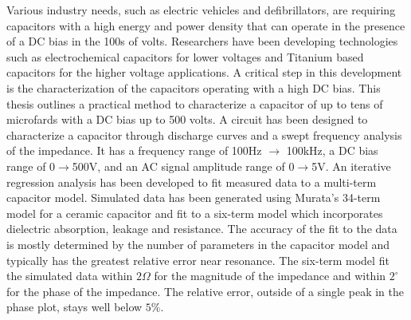 \label{sec:abstract}
Various industry needs, such as electric vehicles and defibrillators, are requiring capacitors with a high energy and power density that can operate in the presence of a DC bias in the 100s of volts. Researchers have been developing technologies such as electrochemical capacitors for lower voltages and Titanium based capacitors for the higher voltage applications. A critical step in this development is the characterization of the capacitors operating with a high DC bias.
This thesis outlines a practical method to characterize a capacitor of up to tens of microfards with a DC bias up to 500 volts. A circuit has been designed to characterize a capacitor through discharge curves and a swept frequency analysis of the impedance. It has a frequency range of 100Hz $\rightarrow$ 100kHz, a DC bias range of 0$\rightarrow$500V, and an AC signal amplitude range of 0$\rightarrow$5V.
An iterative regression analysis has been developed to fit measured data to a multi-term capacitor model. Simulated data has been generated using Murata’s 34-term model for a ceramic capacitor and fit to a six-term model which incorporates dielectric absorption, leakage and resistance. The accuracy of the fit to the data is mostly determined by the number of parameters in the capacitor model and typically has the greatest relative error near resonance. The six-term model fit the simulated data within $2 \Omega$ for the magnitude of the impedance and within $2^{\circ}$ for the phase of the impedance. The relative error, outside of a single peak in the phase plot, stays well below $5\%$.
